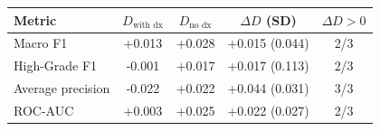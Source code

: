 \begin{tabular}{lcccc}
\toprule
Metric & $D_{\text{with dx}}$ & $D_{\text{no dx}}$ & $\Delta D$ (SD) & $\Delta D>0$ \\
\midrule
Macro F1 & +0.013 & +0.028 & +0.015 (0.044) & 2/3 \\
High-Grade F1 & -0.001 & +0.017 & +0.017 (0.113) & 2/3 \\
Average precision & -0.022 & +0.022 & +0.044 (0.031) & 3/3 \\
ROC-AUC & +0.003 & +0.025 & +0.022 (0.027) & 2/3 \\
\bottomrule
\end{tabular}
